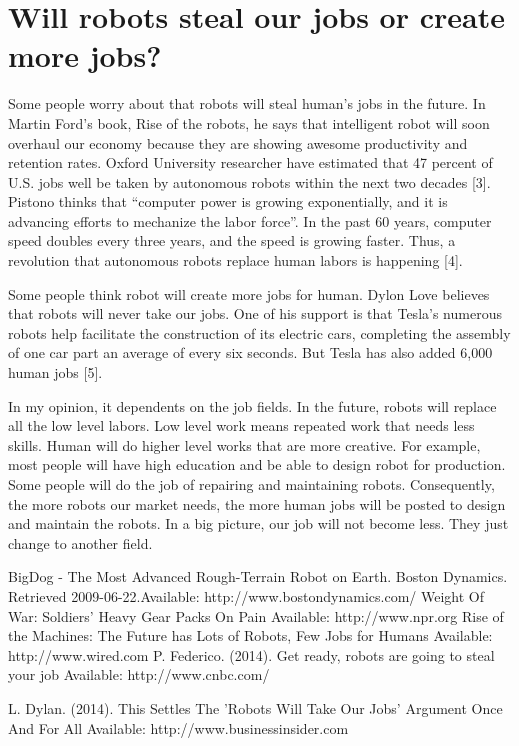 \documentclass[letterpaper, 12 pt, conference]{ieeeconf}
\begin{document}
\section{Will robots steal our jobs or create more jobs?}
Some people worry about that robots will steal human’s jobs in the future. In Martin Ford’s book, Rise of the robots, he says that intelligent robot will soon overhaul our economy because they are showing awesome productivity and retention rates. Oxford University researcher have estimated that 47 percent of U.S. jobs well be taken by autonomous robots within the next two decades [3]. Pistono thinks that “computer power is growing exponentially, and it is advancing efforts to mechanize the labor force”. In the past 60 years, computer speed doubles every three years, and the speed is growing faster. Thus, a revolution that autonomous robots replace human labors is happening [4].

Some people think robot will create more jobs for human. Dylon Love believes that robots will never take our jobs. One of his support is that Tesla's numerous robots help facilitate the construction of its electric cars, completing the assembly of one car part an average of every six seconds. But Tesla has also added 6,000 human jobs [5]. 

In my opinion, it dependents on the job fields. In the future, robots will replace all the low level labors. Low level work means repeated work that needs less skills. Human will do higher level works that are more creative. For example, most people will have high education and be able to design robot for production. Some people will do the job of repairing and maintaining robots. Consequently, the more robots our market needs, the more human jobs will be posted to design and maintain the robots. In a big picture, our job will not become less. They just change to another field. 

\begin{thebibliography}{99}
 BigDog - The Most Advanced Rough-Terrain Robot on Earth. Boston Dynamics. Retrieved 2009-06-22.Available: http://www.bostondynamics.com/
 Weight Of War: Soldiers' Heavy Gear Packs On Pain Available: http://www.npr.org
Rise of the Machines: The Future has Lots of Robots, Few Jobs for Humans  Available: http://www.wired.com
P. Federico. (2014). Get ready, robots are going to steal your job Available: http://www.cnbc.com/

L. Dylan. (2014). This Settles The 'Robots Will Take Our Jobs' Argument Once And For All  Available: http://www.businessinsider.com


\end{thebibliography}
\end{document}
